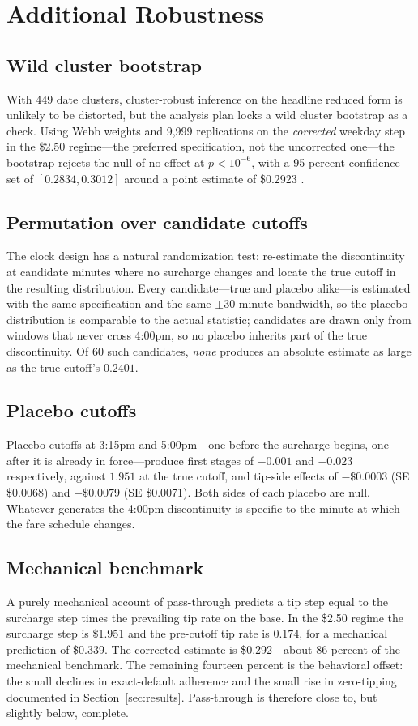 \section{Additional Robustness}
\label{app:robustness}

\subsection{Wild cluster bootstrap}
With 449 date clusters, cluster-robust inference on the headline
reduced form is unlikely to be distorted, but the analysis plan locks a
wild cluster bootstrap as a check. Using Webb weights and 9{,}999
replications on the \emph{corrected} weekday step in the \$2.50
regime---the preferred specification, not the uncorrected one---the
bootstrap rejects the null of no effect at $p < 10^{-6}$, with a 95
percent confidence set of $[0.2834, 0.3012]$ around a point estimate of
\$0.2923 \parencite{cameron2008bootstrap}.

\subsection{Permutation over candidate cutoffs}
The clock design has a natural randomization test: re-estimate the
discontinuity at candidate minutes where no surcharge changes and locate
the true cutoff in the resulting distribution. Every candidate---true
and placebo alike---is estimated with the same specification and the
same $\pm 30$ minute bandwidth, so the placebo distribution is
comparable to the actual statistic; candidates are drawn only from
windows that never cross 4:00pm, so no placebo inherits part of the true
discontinuity. Of 60 such candidates, \emph{none} produces an absolute
estimate as large as the true cutoff's $0.2401$.

\subsection{Placebo cutoffs}
Placebo cutoffs at 3:15pm and 5:00pm---one before the surcharge begins,
one after it is already in force---produce first stages of $-0.001$ and
$-0.023$ respectively, against $1.951$ at the true cutoff, and tip-side
effects of $-\$0.0003$ (SE \$0.0068) and $-\$0.0079$ (SE \$0.0071).
Both sides of each placebo are null. Whatever generates the 4:00pm
discontinuity is specific to the minute at which the fare schedule
changes.

\subsection{Mechanical benchmark}
A purely mechanical account of pass-through predicts a tip step equal to
the surcharge step times the prevailing tip rate on the base. In the
\$2.50 regime the surcharge step is \$1.951 and the pre-cutoff tip rate
is $0.174$, for a mechanical prediction of \$0.339. The corrected
estimate is \$0.292---about 86 percent of the mechanical benchmark. The
remaining fourteen percent is the behavioral offset: the small declines
in exact-default adherence and the small rise in zero-tipping documented
in Section~\ref{sec:results}. Pass-through is therefore close to, but
slightly below, complete.

